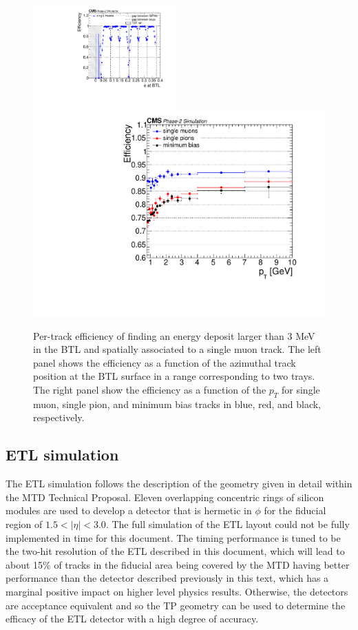 \begin{figure}[hbtp]
\centering
\includegraphics[width=0.49\textwidth]{fig/performance/c_all_efficiency_vs_phi.pdf}
\includegraphics[width=0.49\linewidth]{fig/performance/c_all_efficiency_vs_pt.pdf}
\caption{Per-track efficiency of finding an energy deposit larger than 3 MeV in the BTL and spatially associated to a single muon track. The left panel shows the efficiency as a function of the azimuthal track position at the BTL surface in a range corresponding to two trays. The right panel show the efficiency as a function of the $p_{T}$ for single muon, single pion, and minimum bias tracks in blue, red, and black, respectively.}
\label{fig:BTL_efficiency_pos}
\end{figure}


\subsection{ETL simulation}

The ETL simulation follows the description of the geometry given in detail within the MTD Technical Proposal. Eleven overlapping concentric rings of silicon modules are used to develop a detector that is hermetic in $\phi$ for the fiducial region of $1.5 < |\eta| < 3.0$. The full simulation of the ETL layout could not be fully implemented in time for this document. The timing performance is tuned to
be the two-hit resolution of the ETL described in this document, which will lead to about 15\% of tracks in the fiducial area being covered by the MTD having better performance than the detector described previously in this text, which has a marginal positive impact on higher level physics results. Otherwise, the detectors are acceptance equivalent and so the TP geometry can be used to determine the efficacy of the ETL detector with a high degree of accuracy.

